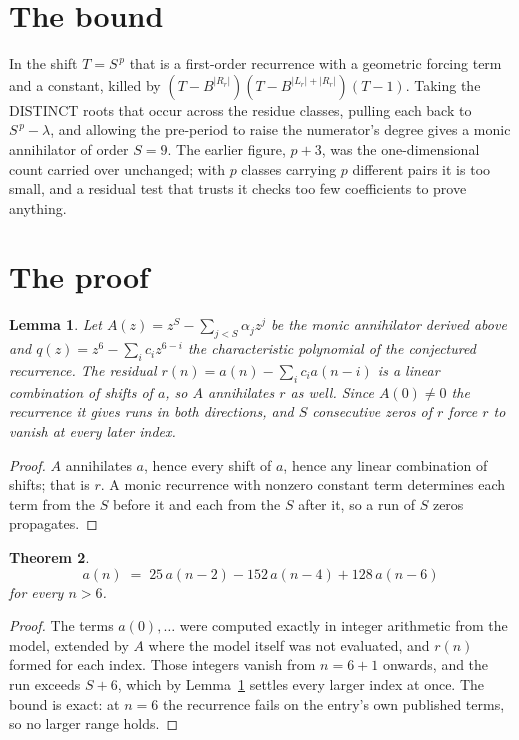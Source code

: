 \documentclass[11pt,a4paper]{article}
\theoremstyle{plain}
\newtheorem{theorem}{Theorem}
\newtheorem{lemma}[theorem]{Lemma}
\theoremstyle{definition}
\begin{document}
\section{The bound}

In the shift $T=S^{\,p}$ that is a first-order recurrence with a geometric forcing term and a
constant, killed by $(T-B^{|R_r|})(T-B^{|L_r|+|R_r|})(T-1)$. Taking the DISTINCT roots that
occur across the residue classes, pulling each back to $S^{\,p}-\lambda$, and allowing the
pre-period to raise the numerator's degree gives a monic annihilator of order $S=9$. The
earlier figure, $p+3$, was the one-dimensional count carried over unchanged; with $p$ classes
carrying $p$ different pairs it is too small, and a residual test that trusts it checks too few
coefficients to prove anything.

\section{The proof}

\begin{lemma}\label{lem:crit}
Let $A(z)=z^S-\sum_{j<S}\alpha_jz^{j}$ be the monic annihilator derived above and
$q(z)=z^{6}-\sum_ic_iz^{6-i}$ the characteristic polynomial of the conjectured
recurrence. The residual $r(n)=a(n)-\sum_ic_ia(n-i)$ is a linear combination of shifts of $a$,
so $A$ annihilates $r$ as well. Since $A(0)\ne0$ the recurrence it gives runs in both
directions, and $S$ consecutive zeros of $r$ force $r$ to vanish at every later index.
\end{lemma}

\begin{proof}
$A$ annihilates $a$, hence every shift of $a$, hence any linear combination of shifts; that is
$r$. A monic recurrence with nonzero constant term determines each term from the $S$ before it
and each from the $S$ after it, so a run of $S$ zeros propagates.
\end{proof}

\begin{theorem}
\[
a(n)\;=\;25\,a(n-2) - 152\,a(n-4) + 128\,a(n-6)
\]
for every $n>6$.
\end{theorem}

\begin{proof}
The terms $a(0),\dots$ were computed exactly in integer arithmetic from the model, extended by
$A$ where the model itself was not evaluated, and $r(n)$ formed for each index. Those integers
vanish from $n=6+1$ onwards, and the run exceeds $S+6$, which by
Lemma~\ref{lem:crit} settles every larger index at once. The bound is exact: at $n=6$ the recurrence fails on the entry's own published terms, so no larger range holds.
\end{proof}
\end{document}
